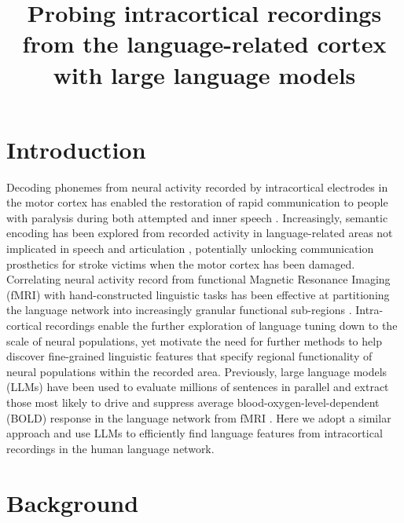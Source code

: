 \documentclass[11pt]{article}
\title{Probing intracortical recordings from the language-related cortex with large language models}
\date{}
\author{}
\begin{document}
\maketitle

\vspace{-1cm}
\section{Introduction}
Decoding phonemes from neural activity recorded by intracortical electrodes in the motor cortex has enabled the restoration of rapid communication to people with paralysis during both attempted and inner speech  \cite{willett2023speech}\cite{kunz2025innerspeech}. Increasingly, semantic encoding has been explored from recorded activity in language-related areas not implicated in speech and articulation \cite{jamali2024semantic}\cite{cai2026language}, potentially unlocking communication prosthetics for stroke victims when the motor cortex has been damaged. Correlating neural activity record from functional Magnetic Resonance Imaging (fMRI) with hand-constructed linguistic tasks has been effective at partitioning the language network into increasingly granular functional sub-regions \cite{Price2012}\cite{clos2013tackling}. Intra-cortical recordings enable the further exploration of language tuning down to the scale of neural populations, yet motivate the need for further methods to help discover fine-grained linguistic features that specify regional functionality of neural populations within the recorded area. Previously, large language models (LLMs) have been used to evaluate millions of sentences in parallel and extract those most likely to drive and suppress average blood-oxygen-level-dependent (BOLD) response in the language network from fMRI \cite{tuckute2023driving}. Here we adopt a similar approach and use LLMs to efficiently find language features from intracortical recordings in the human language network.

\section{Background}
\end{document}
